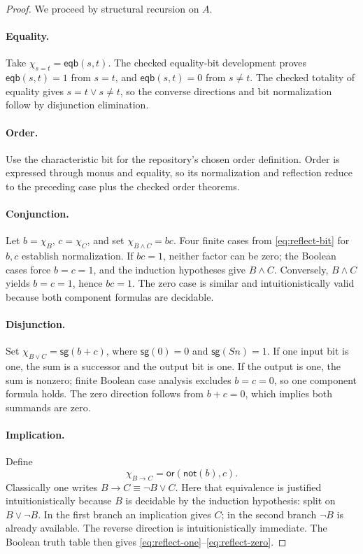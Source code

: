 \begin{proof}
We proceed by structural recursion on \(A\).

\paragraph{Equality.}
Take \(\chi_{s=t}=\mathsf{eqb}(s,t)\).  The checked equality-bit development proves \(\mathsf{eqb}(s,t)=1\) from \(s=t\), and \(\mathsf{eqb}(s,t)=0\) from \(s\neq t\).  The checked totality of equality gives \(s=t\vee s\neq t\), so the converse directions and bit normalization follow by disjunction elimination.

\paragraph{Order.}
Use the characteristic bit for the repository's chosen order definition.  Order is expressed through monus and equality, so its normalization and reflection reduce to the preceding case plus the checked order theorems.

\paragraph{Conjunction.}
Let \(b=\chi_B\), \(c=\chi_C\), and set \(\chi_{B\wedge C}=bc\).  Four finite cases from \eqref{eq:reflect-bit} for \(b,c\) establish normalization.  If \(bc=1\), neither factor can be zero; the Boolean cases force \(b=c=1\), and the induction hypotheses give \(B\wedge C\).  Conversely, \(B\wedge C\) yields \(b=c=1\), hence \(bc=1\).  The zero case is similar and intuitionistically valid because both component formulas are decidable.

\paragraph{Disjunction.}
Set \(\chi_{B\vee C}=\mathsf{sg}(b+c)\), where \(\mathsf{sg}(0)=0\) and \(\mathsf{sg}(S n)=1\).  If one input bit is one, the sum is a successor and the output bit is one.  If the output is one, the sum is nonzero; finite Boolean case analysis excludes \(b=c=0\), so one component formula holds.  The zero direction follows from \(b+c=0\), which implies both summands are zero.

\paragraph{Implication.}
Define
\[
  \chi_{B\to C}=\mathsf{or}(\mathsf{not}(b),c).
\]
Classically one writes \(B\to C\equiv\neg B\vee C\).  Here that equivalence is justified intuitionistically because \(B\) is decidable by the induction hypothesis: split on \(B\vee\neg B\).  In the first branch an implication gives \(C\); in the second branch \(\neg B\) is already available.  The reverse direction is intuitionistically immediate.  The Boolean truth table then gives \eqref{eq:reflect-one}--\eqref{eq:reflect-zero}.


\end{proof}
